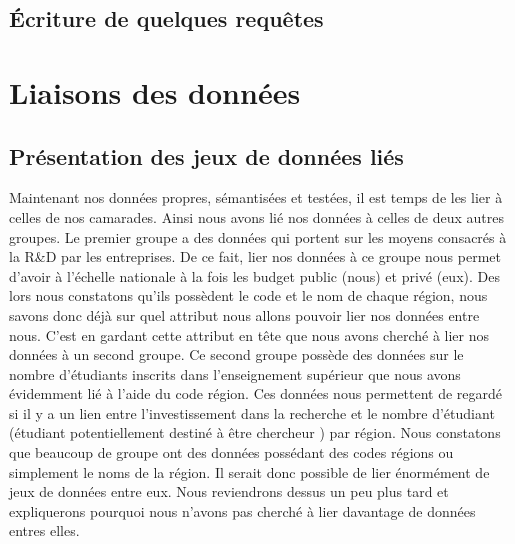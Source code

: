 \documentclass[a4paper,sffamily,12pt]{article}
\begin{document}
			\vspace{0.5cm}

		\subsection{Écriture de quelques requêtes }
			
			\vspace{0.5cm}
	




			\vspace{0.5cm}
			
	\section{Liaisons des données}

		\vspace{0.5cm}
			
		\subsection{Présentation des jeux de données liés}
			
			\vspace{0.5cm}			

				Maintenant nos données propres, sémantisées et testées, il est temps de les lier à celles de nos camarades. Ainsi nous avons lié nos données à celles de deux autres groupes. Le premier groupe a des données qui portent sur les moyens consacrés à la R\&D par les entreprises. De ce fait, lier nos données à ce groupe nous permet d'avoir à l'échelle nationale à la fois les budget public (nous) et privé (eux). Des lors nous constatons qu'ils possèdent le code et le nom de chaque région, nous savons donc déjà sur quel attribut nous allons pouvoir lier nos données entre nous. C'est en gardant cette attribut en tête que nous avons cherché à lier nos données à un second groupe. Ce second groupe possède des données sur le nombre d'étudiants inscrits dans l'enseignement supérieur que nous avons évidemment lié à l'aide du code région. Ces données nous permettent de regardé si il y a un lien entre l'investissement dans la recherche et le nombre d'étudiant (étudiant potentiellement destiné à être chercheur )  par région. Nous constatons que beaucoup de groupe ont des données possédant des codes régions ou simplement le noms de la région. Il serait donc possible de lier énormément de jeux de données entre eux. Nous reviendrons dessus un peu plus tard et expliquerons pourquoi nous n'avons pas cherché à lier davantage de données entres elles. 
\end{document}
